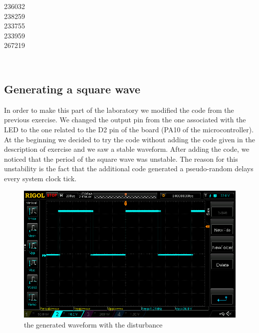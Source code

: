 \documentclass[12pt]{article}
\begin{document}
\begin{titlepage}
\begin{minipage}{0.4\textwidth}
			\begin{flushright} \large
			236032\\													%
			238259\\
            233755\\
            233959\\
            267219\\
            
		\end{flushright}
        
	\end{minipage}\\[2 cm]
	
\end{titlepage}

\newpage

\subsection{Generating a square wave}
In order to make this part of the laboratory we modified the code from the previous exercise. We changed the output pin from the one associated with the LED to the one related to the D2 pin of the board (PA10 of the microcontroller).
At the beginning we decided to try the code without adding the code given in the description of exercise and we saw a stable waveform. After adding the code, we noticed that the period of the square wave was unstable. The reason for this unstability is the fact that the additional code generated a pseudo-random delays every system clock tick.

\begin{figure}[h]
	\center
	\includegraphics[scale = 0.45]{NewFile1.png}
	\caption{the generated waveform with the disturbance}
\end{figure}
\end{document}

